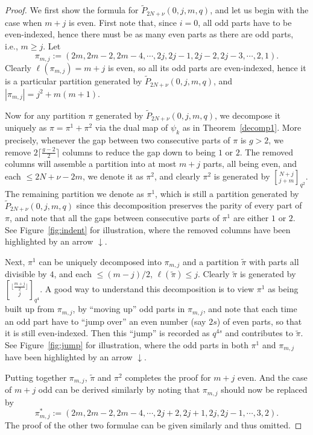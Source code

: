 \documentclass[12pt]{amsart}
\numberwithin{equation}{section}
\theoremstyle{plain}
\theoremstyle{definition}
\begin{document}
\begin{proof}
We first show the formula for $\tilde{P}_{2N+\nu}(0,j,m,q)$, and let us begin with the case when $m+j$ is even. First note that, since $i=0$, all odd parts have to be even-indexed, hence there must be as many even parts as there are odd parts, i.e., $m\geq j$. Let 
$$\pi_{m,j}:=(2m,2m-2,2m-4,\cdots,2j,2j-1,2j-2,2j-3,\cdots,2,1).$$
Clearly $\ell(\pi_{m,j})=m+j$ is even, so all its odd parts are even-indexed, hence it is a particular partition generated by $\tilde{P}_{2N+\nu}(0,j,m,q)$, and $|\pi_{m,j}|=j^2+m(m+1)$. 

Now for any partition $\pi$ generated by $\tilde{P}_{2N+\nu}(0,j,m,q)$, we decompose it uniquely as $\pi=\pi^1+\pi^2$ via the dual map of $\psi_k$ as in Theorem~\ref{decomp1}. More precisely, whenever the gap between two consecutive parts of $\pi$ is $g>2$, we remove $2\lceil\frac{g-2}{2}\rceil$ columns to reduce the gap down to being $1$ or $2$. The removed columns will assemble a partition into at most $m+j$ parts, all being even, and each $\leq 2N+\nu-2m$, we denote it as $\pi^2$, and clearly $\pi^2$ is generated by ${N+j\brack j+m}_{q^2}$. The remaining partition we denote as $\pi^1$, which is still a partition generated by $\tilde{P}_{2N+\nu}(0,j,m,q)$ since this decomposition preserves the parity of every part of $\pi$, and note that all the gaps between consecutive parts of $\pi^1$ are either $1$ or $2$. See Figure~\ref{fig:indent} for illustration, where the removed columns have been highlighted by an arrow $\downarrow$.

Next, $\pi^1$ can be uniquely decomposed into $\pi_{m,j}$ and a partition $\tilde{\pi}$ with parts all divisible by $4$, and each $\leq (m-j)/2$, $\ell(\tilde{\pi})\leq j$. Clearly $\tilde{\pi}$ is generated by ${\lfloor \frac{m+j}{2}\rfloor\brack j}_{q^4}$. A good way to understand this decomposition is to view $\pi^1$ as being built up from $\pi_{m,j}$, by ``moving up'' odd parts in $\pi_{m,j}$, and note that each time an odd part have to ``jump over'' an even number (say $2s$) of even parts, so that it is still even-indexed. Then this ``jump'' is recorded as $q^{4s}$ and contributes to $\tilde{\pi}$. See Figure~\ref{fig:jump} for illustration, where the odd parts in both $\pi^1$ and $\pi_{m,j}$ have been highlighted by an arrow $\downarrow$.

Putting together $\pi_{m,j}$, $\tilde{\pi}$ and $\pi^2$ completes the proof for $m+j$ even. And the case of $m+j$ odd can be derived similarly by noting that $\pi_{m,j}$ should now be replaced by
$$
\pi_{m,j}^{*}:=(2m,2m-2,2m-4,\cdots,2j+2,2j+1,2j,2j-1,\cdots,3,2).
$$
The proof of the other two formulae can be given similarly and thus omitted.
\end{proof}
\end{document}
